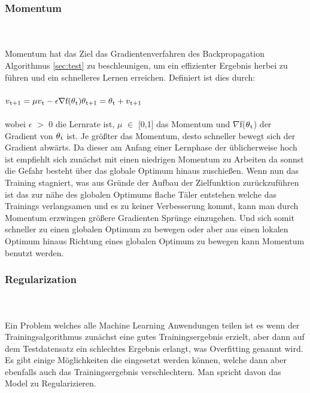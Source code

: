 \documentclass{llncs}
\begin{document}
\subsubsection{Momentum}\label{sec:momentum}
~\\\\
Momentum hat das Ziel das Gradientenverfahren des Backpropagation Algorithmus \ref{sec:test} zu beschleunigen, um ein effizienter Ergebnis herbei zu führen und ein schnelleres Lernen erreichen. Definiert ist dies durch:
\\\\
\begin{math}
v\textsubscript{t+1} =\mu v\textsubscript{t}-\epsilon\nabla$f$(\theta\textsubscript{t})
\theta\textsubscript{t+1}= \theta\textsubscript{t}+v\textsubscript{t+1}
\end{math}
\\\\
wobei $\epsilon$ $>$ 0 die Lernrate ist,  $\mu$ $\in$ [0,1] das Momentum und $\nabla$f($\theta\textsubscript{t}$) der Gradient von $\theta\textsubscript{t}$ ist. Je größter das Momentum, desto schneller bewegt sich der Gradient abwärts. Da dieser am Anfang einer Lernphase der üblicherweise hoch ist empfiehlt sich zunächst mit einen niedrigen Momentum zu Arbeiten da sonnst die Gefahr besteht über das globale Optimum hinaus zuschießen. Wenn nun das Training stagniert, was aus Gründe der Aufbau der Zielfunktion zurückzuführen ist das zur nähe des globalen Optimums flache Täler entstehen welche das Trainings verlangsamen und es zu keiner Verbesserung kommt, kann man durch Momentum erzwingen größere Gradienten Sprünge einzugehen. Und sich somit schneller zu einen globalen Optimum zu bewegen oder aber aus einen lokalen Optimum hinaus Richtung eines globalen Optimum zu bewegen kann Momentum benutzt werden\cite{momentum}.

\subsubsection{Regularization}
~\\\\
Ein Problem welches alle Machine Learning Anwendungen teilen ist es wenn der Trainingsalgorithmus zunächst eine gutes Trainingsergebnis erzielt, aber dann auf dem Testdatensatz ein schlechtes Ergebnis erlangt, was Overfitting genannt wird. Es gibt einige Möglichkeiten die eingesetzt werden können, welche dann aber ebenfalls auch das Trainingsergebnis verschlechtern. Man spricht davon das Model zu Regularizieren.
\end{document}
